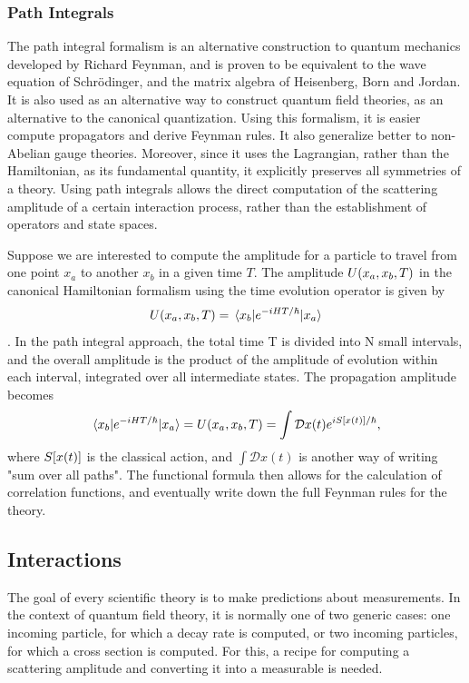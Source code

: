 \subsubsection{Path Integrals}
\label{sec:path-integrals}

The path integral formalism is an alternative construction to quantum mechanics developed by Richard Feynman, and is proven to be equivalent to the wave equation of Schrödinger, and the matrix algebra of Heisenberg, Born and Jordan. It is also used as an alternative way to construct quantum field theories, as an alternative to the canonical quantization. Using this formalism, it is easier compute propagators and derive Feynman rules. It also generalize better to non-Abelian gauge theories. Moreover, since it uses the Lagrangian, rather than the Hamiltonian, as its fundamental quantity, it explicitly preserves all symmetries of a theory. Using path integrals allows the direct computation of the scattering amplitude of a certain interaction process, rather than the establishment of operators and state spaces. 

Suppose we are interested to compute the amplitude for a particle to travel from one point $x_a$ to another $x_b$ in a given time $T$. The amplitude $U\qty(x_a,x_b,T)$ in the canonical Hamiltonian formalism using the time evolution operator is given by
\begin{equation}
U\qty(x_a,x_b,T)=\mel{x_b}{e^{-iHT/\hbar}}{x_a}
\end{equation}.
In the path integral approach, the total time T is divided into N small intervals, and the overall amplitude is the product of the amplitude of evolution within each interval, integrated over all intermediate states. The propagation amplitude becomes
\begin{equation}
\mel{x_b}{e^{-iHT/\hbar}}{x_a}=U\qty(x_a,x_b,T)=\int \mathcal{D}x(t)e^{iS\qty[x(t)]/\hbar},
\end{equation}
where $S\qty[x(t)]$ is the classical action, and $\int \mathcal{D}x(t)$ is another way of writing "sum over all paths". The functional formula then allows for the calculation of correlation functions, and eventually write down the full Feynman rules for the theory.

\subsection{Interactions}

The goal of every scientific theory is to make predictions about measurements. In the context of quantum field theory, it is normally one of two generic cases: one incoming particle, for which a decay rate is computed, or two incoming particles, for which a cross section is computed. For this, a recipe for computing a scattering amplitude and converting it into a measurable is needed.

